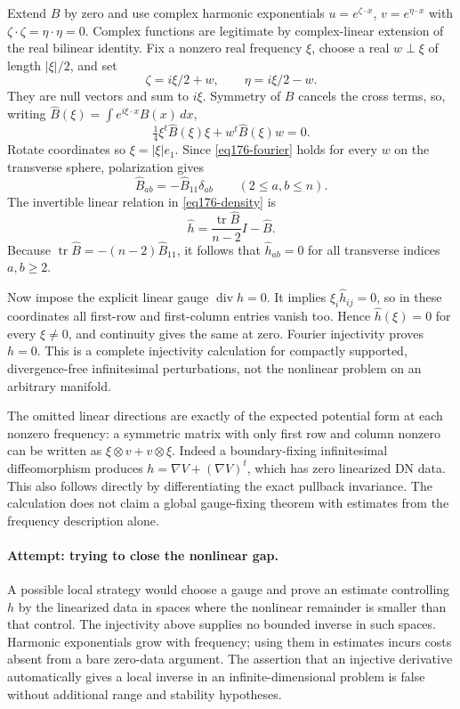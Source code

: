 \documentclass[11pt,a4paper]{article}
\numberwithin{equation}{section}
\begin{document}
Extend $B$ by zero and use complex harmonic exponentials
$u=e^{\zeta\cdot x}$, $v=e^{\eta\cdot x}$ with
$\zeta\cdot\zeta=\eta\cdot\eta=0$. Complex functions are legitimate by
complex-linear extension of the real bilinear identity. Fix a nonzero real
frequency $\xi$, choose a real $w\perp\xi$ of length $|\xi|/2$, and set
\[
 \zeta=i\xi/2+w,\qquad \eta=i\xi/2-w.
\]
They are null vectors and sum to $i\xi$. Symmetry of $B$ cancels the cross
terms, so, writing $\widehat B(\xi)=\int e^{i\xi\cdot x}B(x)\,dx$,
\begin{equation}\label{eq176-fourier}
      \tfrac14\xi^t\widehat B(\xi)\xi+
                           w^t\widehat B(\xi)w=0.
\end{equation}
Rotate coordinates so $\xi=|\xi|e_1$. Since \eqref{eq176-fourier} holds
for every $w$ on the transverse sphere, polarization gives
\[
 \widehat B_{ab}=-\widehat B_{11}\delta_{ab}
                       \qquad(2\le a,b\le n).
\]
The invertible linear relation in \eqref{eq176-density} is
\[
 \widehat h=\frac{\operatorname{tr}\widehat B}{n-2}I-\widehat B.
\]
Because $\operatorname{tr}\widehat B=-(n-2)\widehat B_{11}$, it follows
that $\widehat h_{ab}=0$ for all transverse indices $a,b\ge2$.

Now impose the explicit linear gauge $\operatorname{div}h=0$.
It implies $\xi_i\widehat h_{ij}=0$, so in these coordinates all first-row
and first-column entries vanish too. Hence $\widehat h(\xi)=0$ for every
$\xi\ne0$, and continuity gives the same at zero. Fourier injectivity
proves $h=0$. This is a complete injectivity calculation for compactly
supported, divergence-free infinitesimal perturbations, not the nonlinear
problem on an arbitrary manifold.

The omitted linear directions are exactly of the expected potential form
at each nonzero frequency: a symmetric matrix with only first row and
column nonzero can be written as $\xi\otimes v+v\otimes\xi$.
Indeed a boundary-fixing infinitesimal diffeomorphism produces
$h=\nabla V+(\nabla V)^t$, which has zero linearized DN data. This also
follows directly by differentiating the exact pullback invariance. The
calculation does not claim a global gauge-fixing theorem with estimates
from the frequency description alone.

\paragraph{Attempt: trying to close the nonlinear gap.}
A possible local strategy would choose a gauge and prove an estimate
controlling $h$ by the linearized data in spaces where the nonlinear
remainder is smaller than that control. The injectivity above supplies no
bounded inverse in such spaces. Harmonic exponentials grow with frequency;
using them in estimates incurs costs absent from a bare zero-data argument.
The assertion that an injective derivative automatically gives a local
inverse in an infinite-dimensional problem is false without additional
range and stability hypotheses.
\end{document}
